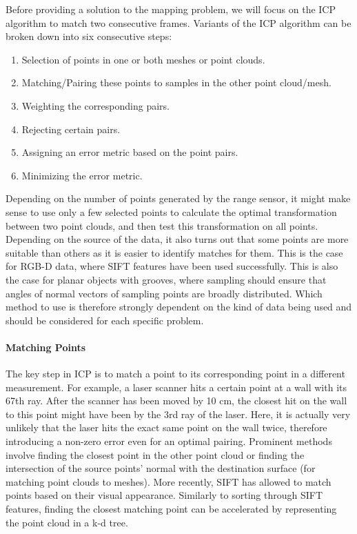 Before providing a solution to the mapping problem, we will focus on the ICP algorithm to match two consecutive frames. Variants of the ICP algorithm can be broken down into six consecutive steps:
\begin{enumerate}
    \item Selection of points in one or both meshes or point clouds.
    \item Matching/Pairing these points to samples in the other point cloud/mesh.
    \item Weighting the corresponding pairs.
    \item Rejecting certain pairs.
    \item Assigning an error metric based on the point pairs.
    \item Minimizing the error metric.
\end{enumerate}
Depending on the number of points generated by the range sensor, it might make sense to use only a few selected points to calculate the optimal transformation between two point clouds, and then test this transformation on all points. Depending on the source of the data, it also turns out that some points are more suitable than others as it is easier to identify matches for them. This is the case for RGB-D data, where SIFT features have been used successfully. This is also the case for planar objects with grooves, where sampling should ensure that angles of normal vectors of sampling points are broadly distributed. Which method to use is therefore strongly dependent on the kind of data being used and should be considered for each specific problem.

\paragraph{Matching Points}
The key step in ICP is to match a point to its corresponding point in a different measurement. For example, a laser scanner hits a certain point at a wall with its 67th ray. After the scanner has been moved by 10 cm, the closest hit on the wall to this point might have been by the 3rd ray of the laser. Here, it is actually very unlikely that the laser hits the exact same point on the wall twice, therefore introducing a non-zero error even for an optimal pairing. Prominent methods involve finding the closest point in the other point cloud or finding the intersection of the source points' normal with the destination surface (for matching point clouds to meshes). More recently, SIFT has allowed to match points based on their visual appearance. Similarly to sorting through SIFT features, finding the closest matching point can be accelerated by representing the point cloud in a k-d tree.

